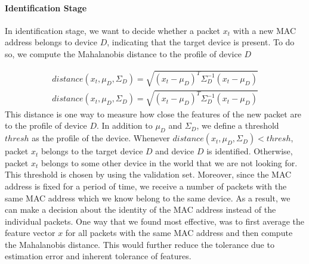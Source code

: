 \paragraph{Identification Stage} In identification stage, we want to decide whether a packet $x_t$ with a new MAC address belongs to device $D$, indicating that the target device is present. To do so, we compute the Mahalanobis distance to the profile of device $D$

\begin{gather*}
    distance(x_t,\mu_D,\Sigma_D) = \sqrt{(x_t-\mu_D)^T\Sigma_D^{-1}(x_t-\mu_D)}
\end{gather*}
\begin{gather*}
    distance(x_t,\mu_D,\Sigma_D) = \sqrt{(x_t-\mu_D)^T\Sigma_D^{-1}(x_t-\mu_D)}
\end{gather*}
This distance is one way to measure how close the features of the new packet are to the profile of device $D$. In addition to $\mu_D$ and $\Sigma_D$, we define a threshold $thresh$ as the profile of the device. Whenever $distance(x_t,\mu_D,\Sigma_D)<thresh$, packet $x_t$ belongs to the target device $D$ and device $D$ is identified. Otherwise, packet $x_t$ belongs to some other device in the world that we are not looking for. This threshold is chosen by using the validation set.
Moreover, since the MAC address is fixed for a period of time, we receive a number of packets with the same MAC address which we know belong to the same device. As a result, we can make a decision about the identity of the MAC address instead of the individual packets. One way that we found most effective, was to first average the feature vector $x$ for all packets with the same MAC address and then compute the Mahalanobis distance. This would further reduce the tolerance due to estimation error and inherent tolerance of features.


\fi



